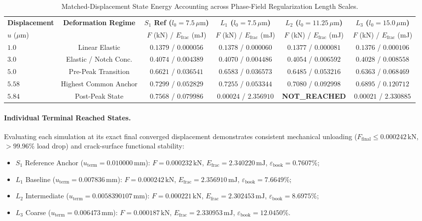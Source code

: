 \begin{table}[htbp]
  \centering
  \small
  \caption{Matched-Displacement State Energy Accounting across Phase-Field Regularization Length Scales.}
  \label{tab:stage14uaa_matched_states}
  \begin{tabular}{lccccc}
    \hline
    \textbf{Displacement} & \textbf{Deformation Regime} & \textbf{$S_1$ Ref ($l_0=7.5\,\mu\mathrm{m}$)} & \textbf{$L_1$ ($l_0=7.5\,\mu\mathrm{m}$)} & \textbf{$L_2$ ($l_0=11.25\,\mu\mathrm{m}$)} & \textbf{$L_3$ ($l_0=15.0\,\mu\mathrm{m}$)} \\
    $u$ ($\mu\mathrm{m}$) & & $F$ (kN) / $E_{\mathrm{frac}}$ (mJ) & $F$ (kN) / $E_{\mathrm{frac}}$ (mJ) & $F$ (kN) / $E_{\mathrm{frac}}$ (mJ) & $F$ (kN) / $E_{\mathrm{frac}}$ (mJ) \\
    \hline
    $1.0$ & Linear Elastic & $0.1379$ / $0.000056$ & $0.1378$ / $0.000060$ & $0.1377$ / $0.000081$ & $0.1376$ / $0.000106$ \\
    $3.0$ & Elastic / Notch Conc. & $0.4074$ / $0.004389$ & $0.4070$ / $0.004486$ & $0.4054$ / $0.006592$ & $0.4028$ / $0.008558$ \\
    $5.0$ & Pre-Peak Transition & $0.6621$ / $0.036541$ & $0.6583$ / $0.036573$ & $0.6485$ / $0.053216$ & $0.6363$ / $0.068469$ \\
    $5.58$ & Highest Common Anchor & $0.7299$ / $0.052829$ & $0.7255$ / $0.053344$ & $0.7080$ / $0.092998$ & $0.6895$ / $0.120712$ \\
    $5.84$ & Post-Peak State & $0.7568$ / $0.079986$ & $0.00024$ / $2.356910$ & \textbf{NOT\_REACHED} & $0.00021$ / $2.330885$ \\
    \hline
  \end{tabular}
\end{table}

\paragraph{Individual Terminal Reached States.}
Evaluating each simulation at its exact final converged displacement demonstrates consistent mechanical unloading ($F_{\text{final}} \le 0.000242\,\mathrm{kN}$, $>99.96\%$ load drop) and crack-surface functional stability:
\begin{itemize}
  \item $S_1$ Reference Anchor ($u_{\text{term}} = 0.010000\,\mathrm{mm}$): $F = 0.000232\,\mathrm{kN}$, $E_{\mathrm{frac}} = 2.340220\,\mathrm{mJ}$, $\varepsilon_{\text{book}} = 0.7607\%$;
  \item $L_1$ Baseline ($u_{\text{term}} = 0.007836\,\mathrm{mm}$): $F = 0.000242\,\mathrm{kN}$, $E_{\mathrm{frac}} = 2.356910\,\mathrm{mJ}$, $\varepsilon_{\text{book}} = 7.6649\%$;
  \item $L_2$ Intermediate ($u_{\text{term}} = 0.0058390107\,\mathrm{mm}$): $F = 0.000221\,\mathrm{kN}$, $E_{\mathrm{frac}} = 2.302453\,\mathrm{mJ}$, $\varepsilon_{\text{book}} = 8.6975\%$;
  \item $L_3$ Coarse ($u_{\text{term}} = 0.006473\,\mathrm{mm}$): $F = 0.000187\,\mathrm{kN}$, $E_{\mathrm{frac}} = 2.330953\,\mathrm{mJ}$, $\varepsilon_{\text{book}} = 12.0450\%$.
\end{itemize}

